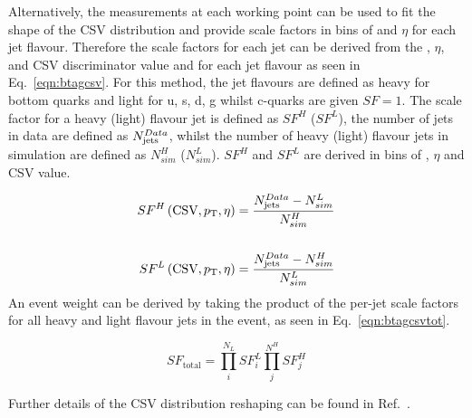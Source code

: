 Alternatively, the measurements at each working point can be used to fit the shape of the CSV distribution and provide scale factors in bins of \pt and $\eta$ for each jet flavour. Therefore the scale factors for each jet can be derived from the \pt, $\eta$, and CSV discriminator value and for each jet flavour as seen in Eq.~\ref{eqn:btagcsv}. For this method, the jet flavours are defined as heavy for bottom quarks and light for u, s, d, g whilst c-quarks are given ${SF} = 1$. The scale factor for a heavy (light) flavour jet is defined as ${SF}^{H}$ (${SF}^{L}$), the number of jets in data are defined as $N_{\textrm{jets}}^{Data}$, whilst the number of heavy (light) flavour jets in simulation are defined as $N^{H}_{sim}$ ($N^{L}_{sim}$). ${SF}^{H}$ and ${SF}^{L}$ are derived in bins of \pt, $\eta$ and CSV value.

\begin{equation}
\label{eqn:btagcsv}
\begin{split}
{SF}^{H} \left(\textrm{CSV},p_{\mathrm{T}},\eta \right) = \frac{N_{\textrm{jets}}^{Data} - N^{L}_{sim}}{N^{H}_{sim}}\\ \\
{SF}^{L} \left(\textrm{CSV},p_{\mathrm{T}},\eta \right) = \frac{N_{\textrm{jets}}^{Data} - N^{H}_{sim}}{N^{L}_{sim}}
\end{split}
\end{equation}
An event weight can be derived by taking the product of the per-jet scale factors for all heavy and light flavour jets in the event, as seen in Eq.~\ref{eqn:btagcsvtot}.

\begin{equation}
{SF}_{\textrm{total}} = \prod_{i}^{N_{L}}{SF}^{L}_{i}\prod_{j}^{N^{H}}{SF}^{H}_{j}
\label{eqn:btagcsvtot}
\end{equation}

Further details of the CSV distribution reshaping can be found in Ref.~\cite{CMS-NOTE-2013-130}.

